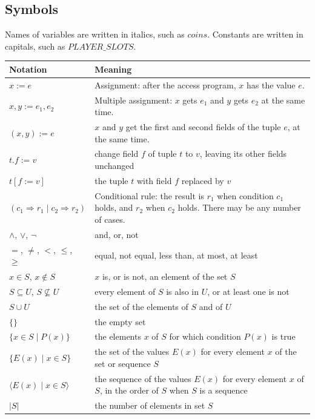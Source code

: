 \documentclass[10pt, titlepage]{article}
\newcommand{\T}[1]{\mathit{#1}}          %
\begin{document}
\subsection{Symbols}

Names of variables are written in italics, such as $\T{coins}$. Constants are
written in capitals, such as $\T{PLAYER\_SLOTS}$.

\begin{center}
\renewcommand{\arraystretch}{1.3}
\begin{tabular}{p{4.6cm} p{10cm}}
\toprule
\textbf{Notation} & \textbf{Meaning}\\
\midrule
$x := e$ & Assignment: after the access program, $x$ has the value $e$.\\
$x, y := e_1, e_2$ & Multiple assignment: $x$ gets $e_1$ and $y$ gets $e_2$ at
the same time.\\
$(x, y) := e$ & $x$ and $y$ get the first and second fields of the tuple
$e$, at the same time.\\
$t.f := v$ & change field $f$ of tuple $t$ to $v$, leaving its other fields
unchanged\\
$t[f := v]$ & the tuple $t$ with field $f$ replaced by $v$\\
$(c_1 \Rightarrow r_1 \mid c_2 \Rightarrow r_2)$ & Conditional rule: the result
is $r_1$ when condition $c_1$ holds, and $r_2$ when $c_2$ holds. There may be
any number of cases.\\
$\wedge$, $\vee$, $\neg$ & and, or, not\\
$=$, $\neq$, $<$, $\leq$, $\geq$ & equal, not equal, less than, at most,
at least\\
$x \in S$, $x \notin S$ & $x$ is, or is not, an element of the set $S$\\
$S \subseteq U$, $S \not\subseteq U$ & every element of $S$ is also in $U$,
or at least one is not\\
$S \cup U$ & the set of the elements of $S$ and of $U$\\
$\{\}$ & the empty set\\
$\{x \in S \mid P(x)\}$ & the elements $x$ of $S$ for which condition
$P(x)$ is true\\
$\{E(x) \mid x \in S\}$ & the set of the values $E(x)$ for every element $x$
of the set or sequence $S$\\
$\langle E(x) \mid x \in S\rangle$ & the sequence of the values $E(x)$ for
every element $x$ of $S$, in the order of $S$ when $S$ is a sequence\\
$|S|$ & the number of elements in set $S$\\

\end{tabular}
\end{center}
\end{document}

